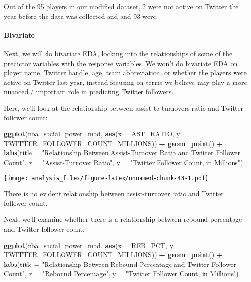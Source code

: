 \documentclass[]{article}
\newenvironment{Shaded}{\begin{snugshade}}{\end{snugshade}}
\newcommand{\DataTypeTok}[1]{\textcolor[rgb]{0.13,0.29,0.53}{#1}}
\newcommand{\KeywordTok}[1]{\textcolor[rgb]{0.13,0.29,0.53}{\textbf{#1}}}
\newcommand{\NormalTok}[1]{#1}
\newcommand{\OperatorTok}[1]{\textcolor[rgb]{0.81,0.36,0.00}{\textbf{#1}}}
\newcommand{\StringTok}[1]{\textcolor[rgb]{0.31,0.60,0.02}{#1}}
\let\oldparagraph\paragraph
\renewcommand{\paragraph}[1]{\oldparagraph{#1}\mbox{}}
\begin{document}
Out of the 95 players in our modified dataset, 2 were not active on
Twitter the year before the data was collected and and 93 were.

\hypertarget{bivariate-1}{%
\paragraph{Bivariate}\label{bivariate-1}}

Next, we will do bivariate EDA, looking into the relationships of some
of the predictor variables with the response variables. We won't do
bivariate EDA on player name, Twitter handle, age, team abbreviation, or
whether the players were active on Twitter last year, instead focusing
on terms we believe may play a more nuanced / important role in
predicting Twitter followers.

Here, we'll look at the relationship between assist-to-turnovers ratio
and Twitter follower count:

\begin{Shaded}
\begin{Highlighting}[]
\KeywordTok{ggplot}\NormalTok{(nba_social_power_mod, }
       \KeywordTok{aes}\NormalTok{(}\DataTypeTok{x =}\NormalTok{ AST_RATIO,}
           \DataTypeTok{y =}\NormalTok{ TWITTER_FOLLOWER_COUNT_MILLIONS)) }\OperatorTok{+}\StringTok{ }
\StringTok{  }\KeywordTok{geom_point}\NormalTok{() }\OperatorTok{+}\StringTok{ }
\StringTok{  }\KeywordTok{labs}\NormalTok{(}\DataTypeTok{title =} \StringTok{"Relationship Between Assist-Turnover Ratio and Twitter Follower Count"}\NormalTok{, }
       \DataTypeTok{x =} \StringTok{"Assist-Turnover Ratio"}\NormalTok{,}
       \DataTypeTok{y =} \StringTok{"Twitter Follower Count, in Millions"}\NormalTok{)}
\end{Highlighting}
\end{Shaded}

\texttt{[image: analysis\_files/figure-latex/unnamed-chunk-43-1.pdf]}

There is no evident relationship between assist-turnover ratio and
Twitter follower count.

Next, we'll examine whether there is a relationship between rebound
percentage and Twitter follower count:

\begin{Shaded}
\begin{Highlighting}[]
\KeywordTok{ggplot}\NormalTok{(nba_social_power_mod, }
       \KeywordTok{aes}\NormalTok{(}\DataTypeTok{x =}\NormalTok{ REB_PCT,}
           \DataTypeTok{y =}\NormalTok{ TWITTER_FOLLOWER_COUNT_MILLIONS)) }\OperatorTok{+}\StringTok{ }
\StringTok{  }\KeywordTok{geom_point}\NormalTok{() }\OperatorTok{+}\StringTok{ }
\StringTok{  }\KeywordTok{labs}\NormalTok{(}\DataTypeTok{title =} \StringTok{"Relationship Between Rebound Percentage and Twitter Follower Count"}\NormalTok{,}
       \DataTypeTok{x =} \StringTok{"Rebound Percentage"}\NormalTok{,}
       \DataTypeTok{y =} \StringTok{"Twitter Follower Count, in Millions"}\NormalTok{)}
\end{Highlighting}
\end{Shaded}
\end{document}
